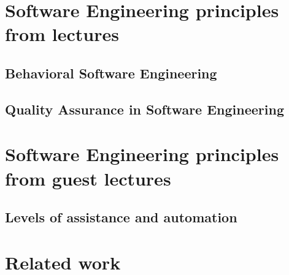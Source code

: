 \documentclass[a4paper,twocolumn]{article}
\begin{document}
\section*{Software Engineering principles from lectures}

\subsection*{Behavioral Software Engineering}

\subsection*{Quality Assurance in Software Engineering}

\section*{Software Engineering principles from guest lectures}

\subsection*{Levels of assistance and automation}

\section*{Related work}



\end{document}
